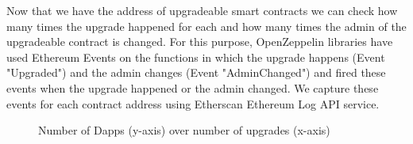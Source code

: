 Now that we have the address of upgradeable smart contracts we can check how many times the upgrade happened for each and how many times the admin of the upgradeable contract is changed. For this purpose, OpenZeppelin libraries have used Ethereum Events on the functions in which the upgrade happens (Event "Upgraded") and the admin changes (Event "AdminChanged") and fired these events when the upgrade happened or the admin changed. We capture these events for each contract address using Etherscan Ethereum Log API service.

\begin{figure}[t]
  \centering
      \qquad
  \caption{Number of Dapps (y-axis) over number of upgrades (x-axis) \label{fig:upgrade}}
\end{figure}
